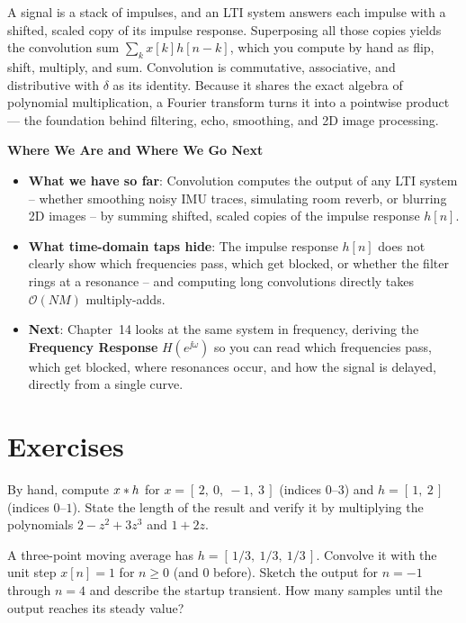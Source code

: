 \begin{recoverybox}
A signal is a stack of impulses, and an LTI system
answers each impulse with a shifted, scaled copy of its impulse response.
Superposing all those copies yields the convolution sum $\sum_k x[k]h[n-k]$, which you compute by hand as
flip, shift, multiply, and sum. Convolution is commutative, associative, and distributive with
$\delta$ as its identity. Because it shares the exact algebra of polynomial multiplication, a
Fourier transform turns it into a pointwise product --- the foundation behind
filtering, echo, smoothing, and 2D image processing.
\end{recoverybox}

\begin{connectionbox}
\textbf{Where We Are and Where We Go Next}
\begin{itemize}
  \item \textbf{What we have so far}: Convolution computes the output of any LTI system -- whether
  smoothing noisy IMU traces, simulating room reverb, or blurring 2D images -- by summing shifted,
  scaled copies of the impulse response $h[n]$.
  \item \textbf{What time-domain taps hide}: The impulse response $h[n]$ does not clearly show which frequencies pass, which get blocked, or whether the filter rings at a resonance -- and
  computing long convolutions directly takes $\mathcal{O}(NM)$ multiply-adds.
  \item \textbf{Next}: Chapter~14 looks at the same system in frequency, deriving the
  \textbf{Frequency Response} $H(e^{\jj\omega})$ so you can read which frequencies pass, which get blocked, where resonances occur, and how the signal is delayed, directly from a single curve.
\end{itemize}
\end{connectionbox}

\section{Exercises}
\label{ch13:exercises}

\begin{exercise}
\label{ch13:ex1}
By hand, compute $x \ast h$ for $x = [\,2,\ 0,\ -1,\ 3\,]$ (indices $0$--$3$)
and $h = [\,1,\ 2\,]$ (indices $0$--$1$). State the length of the result and
verify it by multiplying the polynomials $2 - z^2 + 3z^3$ and $1 + 2z$.
\end{exercise}

\begin{exercise}
\label{ch13:ex2}
A three-point moving average has $h = [\,1/3,\ 1/3,\ 1/3\,]$. Convolve it with
the unit step $x[n] = 1$ for $n \ge 0$ (and $0$ before). Sketch the output for
$n = -1$ through $n = 4$ and describe the startup transient. How many samples
until the output reaches its steady value?
\end{exercise}


